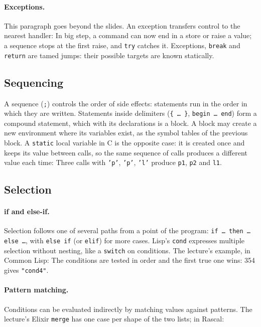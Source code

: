 \paragraph{Exceptions.} This paragraph goes beyond the slides. An exception
transfers control to the nearest handler:
In big step, a command can now end in a store or raise a value; a sequence
stops at the first raise, and \texttt{try} catches it. Exceptions, \texttt{break}
and \texttt{return} are tamed jumps: their possible targets are known
statically.

\subsection{Sequencing}

A sequence (\texttt{;}) controls the order of side effects: statements run in
the order in which they are written. Statements inside delimiters
(\texttt{\{ \dots{} \}}, \texttt{begin \dots{} end}) form a compound statement,
which with its declarations is a block. A block may create a new environment
where its variables exist, as the symbol tables of the previous block. A
\texttt{static} local variable in C is the opposite case: it is created once
and keeps its value between calls, so the same sequence of calls produces a
different value each time:
Three calls with \texttt{'p'}, \texttt{'p'}, \texttt{'l'} produce \texttt{p1},
\texttt{p2} and \texttt{l1}.

\subsection{Selection}

\paragraph{if and else-if.} Selection follows one of several paths from a point
of the program: \texttt{if \dots{} then \dots{} else \dots}, with \texttt{else if}
(or \texttt{elif}) for more cases. Lisp's \texttt{cond} expresses multiple
selection without nesting, like a \texttt{switch} on conditions. The lecture's
example, in Common Lisp:
The conditions are tested in order and the first true one wins: 354 gives
\texttt{"cond4"}.

\paragraph{Pattern matching.} Conditions can be evaluated indirectly by matching
values against patterns. The lecture's Elixir \texttt{merge} has one case per
shape of the two lists; in Rascal:

